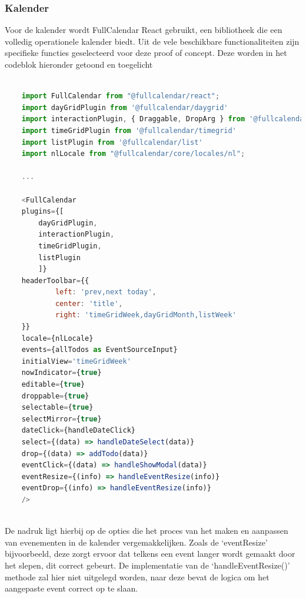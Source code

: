 \subsubsection{Kalender}

Voor de kalender wordt FullCalendar React gebruikt, een bibliotheek die een volledig operationele kalender biedt. Uit de vele beschikbare functionaliteiten zijn specifieke functies geselecteerd voor deze proof of concept. Deze worden in het codeblok hieronder getoond en toegelicht

\begin{lstlisting}[language=JavaScript, caption={Code Snippet - Kalender}, label={lst:codesnippet1}, frame=single, breaklines=true, backgroundcolor=\color{lightgray}]
    
    import FullCalendar from "@fullcalendar/react";
    import dayGridPlugin from '@fullcalendar/daygrid'
    import interactionPlugin, { Draggable, DropArg } from '@fullcalendar/interaction'
    import timeGridPlugin from '@fullcalendar/timegrid'
    import listPlugin from '@fullcalendar/list'
    import nlLocale from "@fullcalendar/core/locales/nl";
    
    ...
    
    <FullCalendar
    plugins={[
        dayGridPlugin,
        interactionPlugin,
        timeGridPlugin,
        listPlugin
        ]}
    headerToolbar={{
            left: 'prev,next today',
            center: 'title',
            right: 'timeGridWeek,dayGridMonth,listWeek'
    }}
    locale={nlLocale}
    events={allTodos as EventSourceInput}
    initialView='timeGridWeek'
    nowIndicator={true}
    editable={true}
    droppable={true}
    selectable={true}
    selectMirror={true}
    dateClick={handleDateClick}
    select={(data) => handleDateSelect(data)}
    drop={(data) => addTodo(data)}
    eventClick={(data) => handleShowModal(data)}
    eventResize={(info) => handleEventResize(info)}
    eventDrop={(info) => handleEventResize(info)}
    />
    
\end{lstlisting}
De nadruk ligt hierbij op de opties die het proces van het maken en aanpassen van evenementen in de kalender vergemakkelijken. Zoals de ‘eventResize’ bijvoorbeeld, deze zorgt ervoor dat telkens een event langer wordt gemaakt door het slepen, dit correct gebeurt. De implementatie van de ‘handleEventResize()’ methode zal hier niet uitgelegd worden, naar deze bevat de logica om het aangepaste event correct op te slaan. \newline

